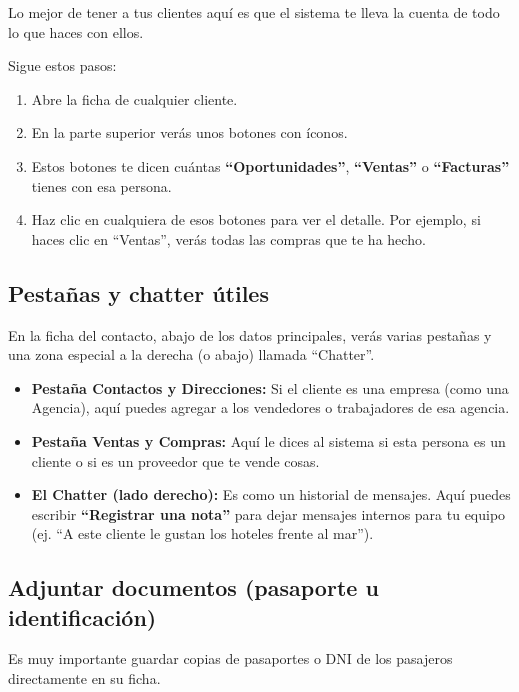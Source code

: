 Lo mejor de tener a tus clientes aquí es que el sistema te lleva la cuenta de todo lo que haces con ellos.

Sigue estos pasos:
\begin{enumerate}
    \item Abre la ficha de cualquier cliente.
    \item En la parte superior verás unos botones con íconos.
    \item Estos botones te dicen cuántas \textbf{``Oportunidades''}, \textbf{``Ventas''} o \textbf{``Facturas''} tienes con esa persona.
    \item Haz clic en cualquiera de esos botones para ver el detalle. Por ejemplo, si haces clic en ``Ventas'', verás todas las compras que te ha hecho.
\end{enumerate}

\subsection{Pestañas y chatter útiles}

En la ficha del contacto, abajo de los datos principales, verás varias pestañas y una zona especial a la derecha (o abajo) llamada ``Chatter''.

\begin{itemize}
    \item \textbf{Pestaña Contactos y Direcciones:} Si el cliente es una empresa (como una Agencia), aquí puedes agregar a los vendedores o trabajadores de esa agencia.
    \item \textbf{Pestaña Ventas y Compras:} Aquí le dices al sistema si esta persona es un cliente o si es un proveedor que te vende cosas.
    \item \textbf{El Chatter (lado derecho):} Es como un historial de mensajes. Aquí puedes escribir \textbf{``Registrar una nota''} para dejar mensajes internos para tu equipo (ej. ``A este cliente le gustan los hoteles frente al mar'').
\end{itemize}

\subsection{Adjuntar documentos (pasaporte u identificación)}

Es muy importante guardar copias de pasaportes o DNI de los pasajeros directamente en su ficha.


